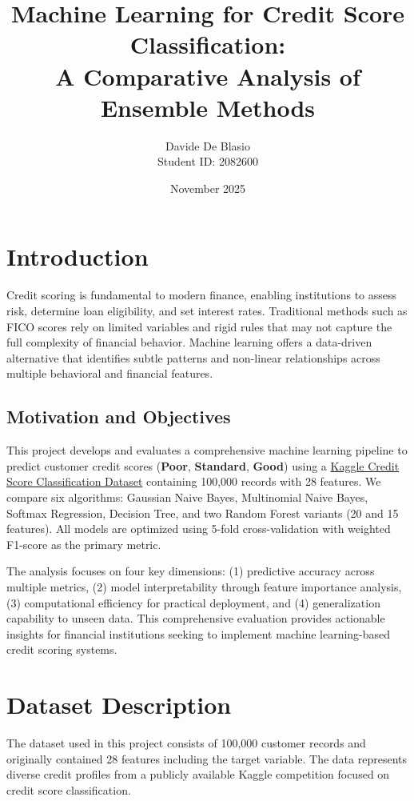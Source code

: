 \documentclass[11pt, a4paper]{article}
\title{\textbf{Machine Learning for Credit Score Classification:}\\A Comparative Analysis of Ensemble Methods}
\author{Davide De Blasio\\Student ID: 2082600}
\date{November 2025}
\begin{document}
\maketitle

\section{Introduction}

Credit scoring is fundamental to modern finance, enabling institutions to assess risk, determine loan eligibility, and set interest rates. Traditional methods such as FICO scores rely on limited variables and rigid rules that may not capture the full complexity of financial behavior. Machine learning offers a data-driven alternative that identifies subtle patterns and non-linear relationships across multiple behavioral and financial features.

\subsection{Motivation and Objectives}

This project develops and evaluates a comprehensive machine learning pipeline to predict customer credit scores (\textbf{Poor}, \textbf{Standard}, \textbf{Good}) using a \href{https://www.kaggle.com/datasets/parisrohan/credit-score-classification}{Kaggle Credit Score Classification Dataset} containing 100,000 records with 28 features. We compare six algorithms: Gaussian Naive Bayes, Multinomial Naive Bayes, Softmax Regression, Decision Tree, and two Random Forest variants (20 and 15 features). All models are optimized using 5-fold cross-validation with weighted F1-score as the primary metric.

The analysis focuses on four key dimensions: (1) predictive accuracy across multiple metrics, (2) model interpretability through feature importance analysis, (3) computational efficiency for practical deployment, and (4) generalization capability to unseen data. This comprehensive evaluation provides actionable insights for financial institutions seeking to implement machine learning-based credit scoring systems.

\section{Dataset Description}

The dataset used in this project consists of 100,000 customer records and originally contained 28 features including the target variable. The data represents diverse credit profiles from a publicly available Kaggle competition focused on credit score classification.
\end{document}
